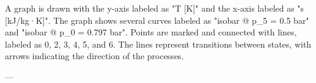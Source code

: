 A graph is drawn with the y-axis labeled as "T [K]" and the x-axis labeled as "s [kJ/kg·K]". The graph shows several curves labeled as "isobar @ p_5 = 0.5 bar" and "isobar @ p_0 = 0.797 bar". Points are marked and connected with lines, labeled as 0, 2, 3, 4, 5, and 6. The lines represent transitions between states, with arrows indicating the direction of the processes.

---